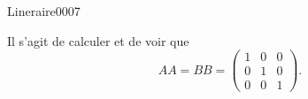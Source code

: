 \begin{corrige}{Lineraire0007}

	Il s'agit de calculer et de voir que
	\begin{equation}
		AA=BB=\begin{pmatrix}
			1	&	0	&	0	\\
			0	&	1	&	0	\\
			0	&	0	&	1
		\end{pmatrix}.
	\end{equation}
\end{corrige}
